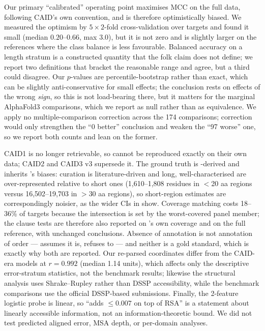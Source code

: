  Our primary ``calibrated'' operating point maximises MCC on the full
data, following CAID's own convention, and is therefore optimistically biased. We measured the
optimism by $5\times2$-fold cross-validation over targets and found it small (median
$0.20$--$0.66$\pp, max $3.0$\pp), but it is not zero and is slightly larger on the \dnox
references where the class balance is less favourable. Balanced accuracy on a length stratum is
a constructed quantity that the folk claim does not define; we report two definitions that
bracket the reasonable range and agree, but a third could disagree. Our $p$-values are
percentile-bootstrap rather than exact, which can be slightly anti-conservative for small
effects; the \cfour conclusion rests on effects of the wrong \emph{sign}, so this is not
load-bearing there, but it matters for the marginal AlphaFold3 comparisons, which we report as
null rather than as equivalence. We apply no multiple-comparison correction across the 174 \cfour
comparisons; correction would only strengthen the ``0 better'' conclusion and weaken the ``97
worse'' one, so we report both counts and lean on the former.

 CAID1 is no longer retrievable, so \citet{kurgan2023} cannot be
reproduced exactly on their own data; CAID2 and CAID3 v3 supersede it. The ground truth is
\disprot-derived and inherits \disprot's biases: curation is literature-driven and long,
well-characterised \idrs are over-represented relative to short ones (1,610--1,808 residues in
$<$20 aa regions versus 16,502--19,703 in $>$30 aa regions), so short-region estimates are
correspondingly noisier, as the wider CIs in  show. Coverage matching costs
18--36\% of targets because the intersection is set by the worst-covered panel member; the
clause tests are therefore also reported on \plddt's own coverage and on the full reference,
with unchanged conclusions. Absence of annotation is not annotation of order --- \dnox assumes it
is, \dpdb refuses to --- and neither is a gold standard, which is exactly why both are reported.
Our re-parsed \afdb coordinates differ from the CAID-era models at $r = 0.992$ (median 1.14
\plddt units), which affects only the descriptive error-stratum statistics, not the benchmark
results; likewise the structural analysis uses Shrake--Rupley rather than DSSP accessibility,
while the benchmark comparisons use the official DSSP-based \afrsa submissions. Finally, the
2-feature logistic probe is linear, so ``\plddt adds $\le 0.007$ on top of RSA'' is a statement
about linearly accessible information, not an information-theoretic bound. We did not test
predicted aligned error, MSA depth, or per-domain analyses.

